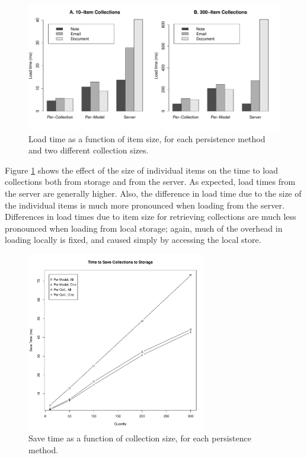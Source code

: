 \documentclass[12pt]{article}
\begin{document}
\begin{figure}[th]
  \centering
  \includegraphics[width=\textwidth]{bars.pdf}
  \caption{Load time as a function of item size, for each persistence method
  and two different collection sizes.}
  \label{fig:bar}
\end{figure}

Figure \ref{fig:bar} shows the effect of the size of individual items on the
time to load collections both from storage and from the server. As expected,
load times from the server are generally higher. Also, the difference in load
time due to the size of the individual items is much more pronounced when
loading from the server. Differences in load times due to item size for
retrieving collections are much less pronounced when loading from local
storage; again, much of the overhead in loading locally is fixed, and caused
simply by accessing the local store.

\begin{figure}[th]
    \centering
    \includegraphics[width=0.7\textwidth]{save.pdf}
    \caption{Save time as a function of collection size, for each persistence
    method.}
    \label{fig:save}
\end{figure}
\end{document}
